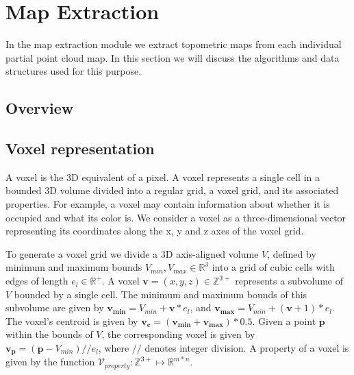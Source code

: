 \documentclass{article}
\begin{document}
\newcommand{\voxel}{\boldsymbol{v}}
\newcommand{\voxelgrid}{\mathcal{V}}
\newcommand{\voxelset}{\mathbb{Z}^{n \times 3}}
\newcommand{\graph}{\mathcal{G}}
\newcommand{\integers}{\mathbb{Z}}
\newcommand{\topologicalgraph}{\mathcal{G}_{\mathbf{T}}}
\newcommand{\topometricmap}{\mathcal{T}}

\section{Map Extraction}
In the map extraction module we extract topometric maps from each individual partial point cloud map. In this section we will discuss the algorithms and data structures used for this purpose.

\subsection{Overview}

\subsection{Voxel representation}
A voxel is the 3D equivalent of a pixel. A voxel represents a single cell in a bounded 3D volume divided into a regular grid, a voxel grid, and its associated properties. For example, a voxel may contain information about whether it is occupied and what its color is. We consider a voxel as a three-dimensional vector representing its coordinates along the x, y and z axes of the voxel grid. 

To generate a voxel grid we divide a 3D axis-aligned volume \(V\), defined by minimum and maximum bounds \(V_{min}, V_{max} \in \mathbb{R}^{3}\) into a grid of cubic cells with edges of length \(e_{l} \in \mathbb{R}^+\). A voxel $\boldsymbol{v} = (x, y, z) \in \mathbb{Z^{3+}}$ represents a subvolume of \(V\) bounded by a single cell. The minimum and maximum bounds of this subvolume are given by \(\boldsymbol{v_{min}} = V_{min} + \boldsymbol{v}*e_{l}\), and \(\boldsymbol{v_{max}} = V_{min} + (\boldsymbol{v}+1)*e_{l}\). The voxel's centroid is given by \(\boldsymbol{v_c} = (\boldsymbol{v_{min}} + \boldsymbol{v_{max}})*0.5\). Given a point \(\boldsymbol{p}\) within the bounds of \(V\), the corresponding voxel is given by \(\boldsymbol{v_p} = (\boldsymbol{p} - V_{min})//e_l\), where \(//\) denotes integer division. A property of a voxel is given by the function \(\mathcal{V}_{property}: \mathbb{Z}^{3+} \mapsto \mathbb{R}^{m*n}\).
\end{document}
